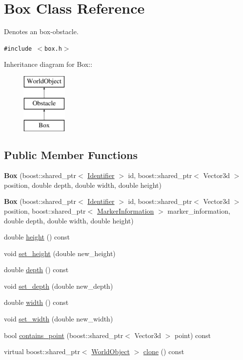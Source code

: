\hypertarget{class_box}{
\section{Box Class Reference}
\label{class_box}
}
Denotes an box-obstacle.  


{\tt \#include $<$box.h$>$}

Inheritance diagram for Box::\begin{figure}[H]
\begin{center}
\leavevmode
\includegraphics[height=3cm]{class_box}
\end{center}
\end{figure}
\subsection*{Public Member Functions}
\begin{CompactItemize}
\item 
\hypertarget{class_box_24307773a7e83c489ab732148ae8dc8a}{
\textbf{Box} (boost::shared\_\-ptr$<$ \hyperlink{class_identifier}{Identifier} $>$ id, boost::shared\_\-ptr$<$ Vector3d $>$ position, double depth, double width, double height)}
\label{class_box_24307773a7e83c489ab732148ae8dc8a}

\item 
\hypertarget{class_box_44331abde2dcbba2f0293c60f87cbdb8}{
\textbf{Box} (boost::shared\_\-ptr$<$ \hyperlink{class_identifier}{Identifier} $>$ id, boost::shared\_\-ptr$<$ Vector3d $>$ position, boost::shared\_\-ptr$<$ \hyperlink{class_marker_information}{MarkerInformation} $>$ marker\_\-information, double depth, double width, double height)}
\label{class_box_44331abde2dcbba2f0293c60f87cbdb8}

\item 
double \hyperlink{class_box_8b436da1c22ee2335d692fe44c53ce90}{height} () const 
\item 
void \hyperlink{class_box_98acafd52d9a5596a6f6d1b87918fd2d}{set\_\-height} (double new\_\-height)
\item 
double \hyperlink{class_box_10dbd2cb5f3c37ca36792d4a1e34240d}{depth} () const 
\item 
void \hyperlink{class_box_8449b2ab9741bd60c24f15de96567a77}{set\_\-depth} (double new\_\-depth)
\item 
double \hyperlink{class_box_cceec88bdb7cccd65b090837e919982c}{width} () const 
\item 
void \hyperlink{class_box_c681f5c0251287c23b004e7e13246581}{set\_\-width} (double new\_\-width)
\item 
bool \hyperlink{class_box_3ef2a0b5fc2bed2036c5fc6e350335f2}{contains\_\-point} (boost::shared\_\-ptr$<$ Vector3d $>$ point) const 
\item 
virtual boost::shared\_\-ptr$<$ \hyperlink{class_world_object}{WorldObject} $>$ \hyperlink{class_box_06c27f9a07a6ba9e87aa0c2e57237b5c}{clone} () const 
\end{CompactItemize}
